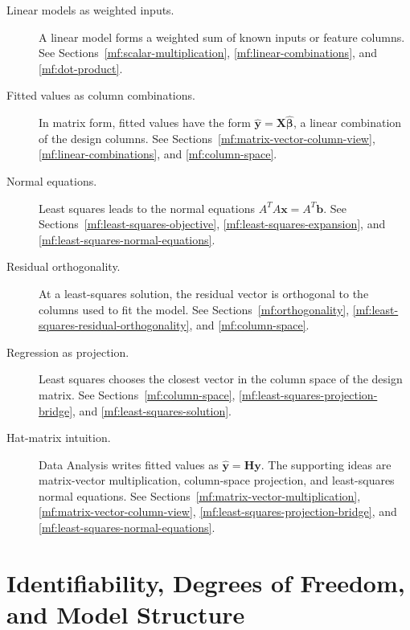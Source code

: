 \begin{description}
    \item[Linear models as weighted inputs.] A linear model forms a weighted sum of known inputs or feature columns. See Sections~\ref{mf:scalar-multiplication}, \ref{mf:linear-combinations}, and \ref{mf:dot-product}.

    \item[Fitted values as column combinations.] In matrix form, fitted values have the form \(\widehat{\mathbf{y}}=\mathbf{X}\widehat{\boldsymbol\beta}\), a linear combination of the design columns. See Sections~\ref{mf:matrix-vector-column-view}, \ref{mf:linear-combinations}, and \ref{mf:column-space}.

    \item[Normal equations.] Least squares leads to the normal equations \(A^TA\mathbf{x}=A^T\mathbf{b}\). See Sections~\ref{mf:least-squares-objective}, \ref{mf:least-squares-expansion}, and \ref{mf:least-squares-normal-equations}.

    \item[Residual orthogonality.] At a least-squares solution, the residual vector is orthogonal to the columns used to fit the model. See Sections~\ref{mf:orthogonality}, \ref{mf:least-squares-residual-orthogonality}, and \ref{mf:column-space}.

    \item[Regression as projection.] Least squares chooses the closest vector in the column space of the design matrix. See Sections~\ref{mf:column-space}, \ref{mf:least-squares-projection-bridge}, and \ref{mf:least-squares-solution}.

    \item[Hat-matrix intuition.] Data Analysis writes fitted values as \(\widehat{\mathbf{y}}=\mathbf{H}\mathbf{y}\). The supporting ideas are matrix-vector multiplication, column-space projection, and least-squares normal equations. See Sections~\ref{mf:matrix-vector-multiplication}, \ref{mf:matrix-vector-column-view}, \ref{mf:least-squares-projection-bridge}, and \ref{mf:least-squares-normal-equations}.
\end{description}

\section{Identifiability, Degrees of Freedom, and Model Structure}
\label{mf:da-bridge-identifiability-model-structure}

